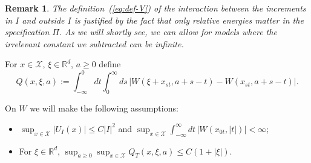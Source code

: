 \documentclass[a4paper,12pt,reqno]{amsart}
\newtheorem{remark}[theorem]{Remark}
\newcommand{\R}{\mathbb{R}}
\newcommand{\X}{\mathcal{X}}
\begin{document}
\begin{remark}
The definition~(\ref{eq:def-V}) of the interaction between the increments in $I$ and outside $I$ is justified by the fact that only relative energies matter in the specification $\Pi$. As we will shortly see, we can allow for models where the irrelevant constant we subtracted can be infinite.  
\end{remark}

 
For $x \in \X$, $\xi \in \R^d$, $a \ge 0$ define
$$
Q(x,\xi,a) := \int_{-\infty}^0 dt \int_{0}^\infty ds \, |W(\xi+x_{st},a+s-t)-W(x_{st},a+s-t)|.
$$

On $W$ we will make the following assumptions:
\begin{itemize}
\item[\textbf{(H1)}] $\sup_{x \in \X} |U_I(x)| \le C |I|^2$ and
$
\sup_{x \in \X}\int_{-\infty}^\infty dt \, |W(x_{0t},|t|)| < \infty
$;
\item[\textbf{(H2)}]
For $\xi\in \R^d$,
$
\sup_{a \ge 0} \sup_{x \in \X} Q_T(x,\xi,a) \le C  (1+|\xi|).
$
\end{itemize}    
\end{document}

